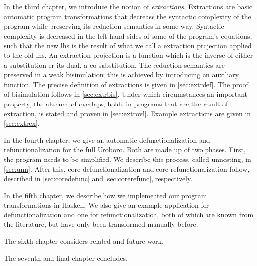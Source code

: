 In the third chapter, we introduce the notion of \textit{extractions}. Extractions are basic automatic program transformations that decrease the syntactic complexity of the program while preserving its reduction semantics in some way. Syntactic complexity is decreased in the left-hand sides of some of the program's equations, such that the new lhs is the result of what we call a extraction projection applied to the old lhs. An extraction projection is a function which is the inverse of either a substitution or its dual, a co-substitution. The reduction semantics are preserved in a weak bisimulation; this is achieved by introducing an auxiliary function. The precise definition of extractions is given in \autoref{sec:extrdef}. The proof of bisimulation follows in \autoref{sec:extrbis}. Under which circumstances an important property, the absence of overlaps, holds in programs that are the result of extraction, is stated and proven in \autoref{sec:extrovl}. Example extractions are given in \autoref{sec:extrex}.

In the fourth chapter, we give an automatic defunctionalization and refunctionalization for the full Uroboro. Both are made up of two phases. First, the program needs to be simplified. We describe this process, called unnesting, in \autoref{sec:unn}. After this, core defunctionalization and core refunctionalization follow, described in \autoref{sec:coredefunc} and \autoref{sec:corerefunc}, respectively.

In the fifth chapter, we describe how we implemented our program transformations in Haskell. We also give an example application for defunctionalization and one for refunctionalization, both of which are known from the literature, but have only been transformed manually before.

The sixth chapter considers related and future work.

The seventh and final chapter concludes.
